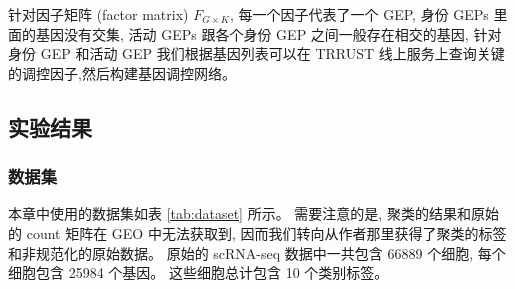 针对因子矩阵 (factor matrix) $F_{G \times K}$, 每一个因子代表了一个 GEP, 
身份 GEPs 里面的基因没有交集, 活动 GEPs 跟各个身份 GEP 之间一般存在相交的基因, 
针对身份 GEP 和活动 GEP 我们根据基因列表可以在 TRRUST 线上服务上查询关键的调控因子,然后构建基因调控网络。

\subsection{实验结果}
\subsubsection{数据集}
本章中使用的数据集如表 \ref{tab:dataset} 所示。
需要注意的是, 聚类的结果和原始的 count 矩阵在 GEO 中无法获取到,
因而我们转向从作者那里获得了聚类的标签和非规范化的原始数据。
原始的 scRNA-seq 数据中一共包含 66889 个细胞, 每个细胞包含 25984 个基因。
这些细胞总计包含 10 个类别标签。

\begin{table}[!htbp]
    \caption{\label{tab:dataset}使用的公开数据集} 
\end{table}

